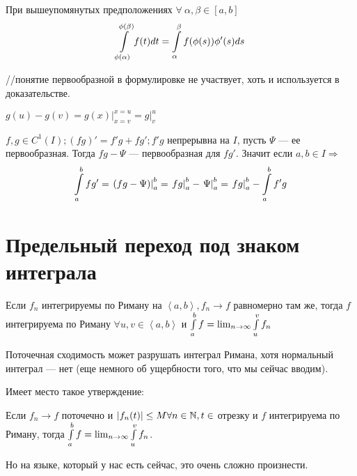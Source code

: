 \documentclass[12pt]{report}
\begin{document}
\begin{thm}
При вышеупомянутых предположениях $\forall ~\alpha, \beta \in [a, b]$
$$\int\limits_{\phi(\alpha)}^{\phi(\beta)}{f(t)dt} = \int\limits_\alpha^\beta{f(\phi(s))\phi'(s)ds}$$
\end{thm}

//понятие первообразной в формулировке не участвует, хоть и используется в доказательстве.

\begin{name}
$g(u) - g(v) = \left.g(x)\right|_{x = v}^{x = u} = \left.g\right|_v^u$
\end{name}

\begin{st}
$f, g \in C^1(I); (fg)' = f'g + fg'; f'g$ непрерывна на $I$, пусть $\Psi$ --- ее первообразная. Тогда $fg - \Psi$ --- первообразная для $fg'$. Значит если $a, b \in I \Rightarrow$
$$\int\limits_a^b{fg'} = \left.(fg - \Psi)\right|_a^b = \left.fg\right|_a^b - \left.\Psi\right|_a^b = \left.fg\right|_a^b - \int\limits_a^b{f'g}$$
\end{st}

\section{Предельный переход под знаком интеграла}

\begin{thm}
Если $f_n$ интегрируемы по Риману на $\left<a, b\right>, f_n \to f$ равномерно там же, тогда $f$ интегрируема по Риману $\forall u, v \in \left<a, b\right>$ и $\int\limits_a^b{f} = \lim_{n \to \infty}{\int\limits_u^v{f_n}}$
\end{thm}

\begin{rem}
Поточечная сходимость может разрушать интеграл Римана, хотя нормальный интеграл --- нет (еще немного об ущербности того, что мы сейчас вводим).

Имеет место такое утверждение:

Если $f_n \to f$ поточечно  и $|f_n(t)| \le M \forall n \in \mathbb{N}, t \in$ отрезку и $f$ интегрируема по Риману, тогда $\int\limits_a^b{f} = \lim_{n \to \infty}{\int\limits_u^v{f_n}}$.

Но на языке, который у нас есть сейчас, это очень сложно произнести.
\end{rem}
\end{document}
